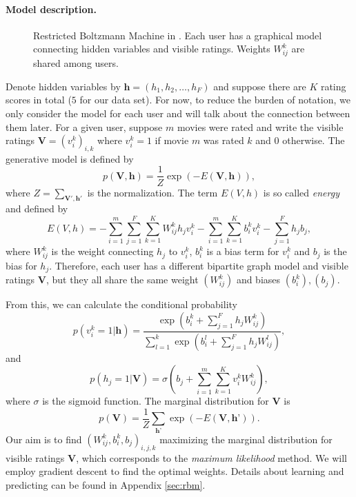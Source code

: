 \documentclass[bj, preprint]{imsart}
\begin{document}
\paragraph{Model description.}\label{par:method.models.rbm.model}

\begin{figure}
	
	\caption{Restricted Boltzmann Machine in . Each user has a graphical model connecting hidden variables and visible ratings. Weights $W_{ij}^{k}$ are shared among users.\label{fig:method.models.rbm}}
\end{figure}



Denote hidden variables by $\textbf{h} = (h_1, h_2,\dots, h_F)$ and suppose there are $K$ rating scores in total ($5$ for our data set). For now, to reduce the burden of notation, we only consider the model for each user and will talk about the connection between them later. For a given user, suppose $m$ movies were rated and write the visible ratings $\textbf{V} = (v_i^k)_{i,k}$ where $v_i^k = 1$ if movie $m$ was rated $k$ and $0$ otherwise. The generative model is defined by
\begin{equation}\label{GenModelRBM}
p(\textbf{V}, \textbf{h}) = \dfrac{1}{Z} \exp(-E(\textbf{V}, \textbf{h})),
\end{equation}
where $Z = \sum_{\textbf{V}', \textbf{h}'}$ is the normalization. The term $E(V, h)$ is so called \textit{energy} and defined by
\begin{equation}\label{EnergyRBM}
E(V,h) = - \sum_{i=1}^{m} \sum_{j=1}^{F} \sum_{k=1}^{K} W_{ij}^k h_j v_i^k - \sum_{i=1}^{m} \sum_{k=1}^{K} b_i^k v_i^k - \sum_{j=1}^{F} h_j b_j,
\end{equation}
where $W_{ij}^k$ is the weight connecting $h_j$ to $v_i^k$, $b_i^k$ is a bias term for $v_i^k$ and $b_j$ is the bias for $h_j$. Therefore, each user has a different bipartite graph model and visible ratings $\textbf{V}$, but they all share the same weight $(W_{ij}^k)$ and biases $(b_i^k), (b_j)$.   

From this, we can calculate the conditional probability 
\begin{equation}\label{pv|h}
p(v_i^k = 1| \textbf{h}) = \dfrac{\exp(b_{i}^{k} + \sum_{j=1}^{F} h_j W_{ij}^k)}{\sum_{l=1}^{k} \exp(b_{i}^{l} + \sum_{j=1}^{F} h_j W_{ij}^l)}, 
\end{equation}
and
\begin{equation}\label{ph|v}
p(h_j = 1 | \textbf{V}) = \sigma(b_j + \sum_{i=1}^{m}\sum_{k=1}^{K} v_i^k W_{ij}^{k}),
\end{equation}
where $\sigma$ is the sigmoid function. The marginal distribution for $\textbf{V}$ is
$$p(\textbf{V}) = \dfrac{1}{Z} \sum_{\textbf{h'}} \exp(-E(\textbf{V}, \textbf{h'})).$$
Our aim is to find $(W_{ij}^{k}, b_{i}^{k}, b_j)_{i,j,k}$ maximizing the marginal distribution for visible ratings $\textbf{V}$, which corresponds to the \textit{maximum likelihood} method. We will employ gradient descent to find the optimal weights. Details about learning and predicting can be found in Appendix \ref{sec:rbm}.
\end{document}
